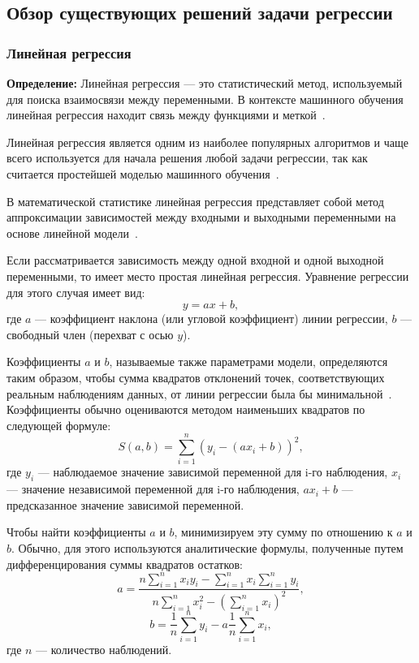 \subsection{Обзор существующих решений задачи регрессии}
\subsubsection{Линейная регрессия}

\textbf{ Определение:} Линейная регрессия --- это статистический метод, используемый для поиска взаимосвязи между переменными.
В контексте машинного обучения линейная регрессия находит связь между функциями и меткой~\cite{google}.

Линейная регрессия является одним из наиболее популярных алгоритмов и чаще всего используется для начала решения любой задачи регрессии, так как считается простейшей моделью машинного обучения~\cite{kemer}.

В математической статистике линейная регрессия представляет собой метод аппроксимации зависимостей между входными и выходными переменными на основе линейной модели~\cite{loginom}.

Если рассматривается зависимость между одной входной и одной выходной переменными, то имеет место простая линейная регрессия.
Уравнение регрессии для этого случая имеет вид:
\begin{equation}
    y = ax + b,
\end{equation}
где $a$ --- коэффициент наклона (или угловой коэффициент) линии регрессии, $b$ --- свободный член (перехват с осью $y$).

Коэффициенты $a$ и $b$, называемые также параметрами модели, определяются таким образом, чтобы сумма квадратов отклонений точек, соответствующих реальным наблюдениям данных, от линии регрессии была бы минимальной~\cite{loginom}.
Коэффициенты обычно оцениваются методом наименьших квадратов по следующей формуле:
\begin{equation}
   S(a, b) = \sum_{i=1}^{n}(y_i - (ax_i + b))^2,
\end{equation}
где $y_i$ --- наблюдаемое значение зависимой переменной для i-го наблюдения, $x_i$ --- значение независимой переменной для i-го наблюдения, $ax_i + b$ --- предсказанное значение зависимой переменной.

Чтобы найти коэффициенты $a$ и $b$, минимизируем эту сумму по отношению к $a$ и $b$.
Обычно, для этого используются аналитические формулы, полученные путем дифференцирования суммы квадратов остатков:
\begin{equation}
    a = \frac{n \sum_{i=1}^{n} x_i y_i - \sum_{i=1}^{n} x_i \sum_{i=1}^{n} y_i}{n \sum_{i=1}^{n} x_i^2 - (\sum_{i=1}^{n} x_i)^2},
\end{equation}
\begin{equation}
    b = \frac{1}{n}\sum_{i=1}^{n} y_i - a\frac{1}{n}\sum_{i=1}^{n} x_i,
\end{equation}
где $n$ --- количество наблюдений.

